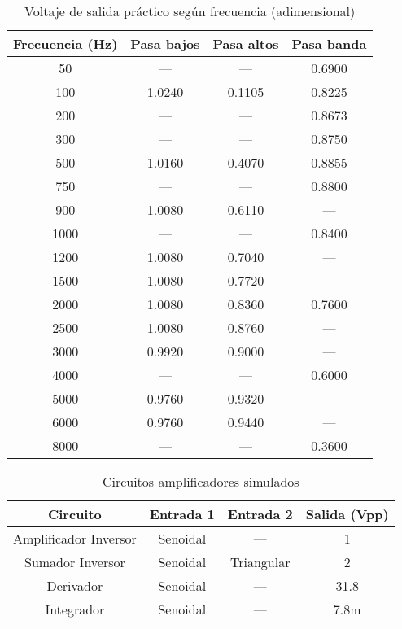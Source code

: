 \begin{table}[H]
  \centering
  \caption{Voltaje de salida práctico según frecuencia (adimensional)}\label{tab:filtros_practicos}
  \begin{tabular}{cccc}
    \toprule
    \textbf{Frecuencia (Hz)} & \textbf{Pasa bajos} & \textbf{Pasa altos} & \textbf{Pasa banda} \\
    \midrule
    50    & ---    & ---    & 0.6900 \\
    100   & 1.0240 & 0.1105 & 0.8225 \\
    200   & ---    & ---    & 0.8673 \\
    300   & ---    & ---    & 0.8750 \\
    500   & 1.0160 & 0.4070 & 0.8855 \\
    750   & ---    & ---    & 0.8800 \\
    900   & 1.0080 & 0.6110 & ---     \\
    1000  & ---    & ---    & 0.8400 \\
    1200  & 1.0080 & 0.7040 & ---     \\
    1500  & 1.0080 & 0.7720 & ---     \\
    2000  & 1.0080 & 0.8360 & 0.7600 \\
    2500  & 1.0080 & 0.8760 & ---     \\
    3000  & 0.9920 & 0.9000 & ---     \\
    4000  & ---    & ---    & 0.6000 \\
    5000  & 0.9760 & 0.9320 & ---     \\
    6000  & 0.9760 & 0.9440 & ---     \\
    8000  & ---    & ---    & 0.3600 \\
    \bottomrule
  \end{tabular}
\end{table}

\begin{table}[H]
  \centering
  \caption{Circuitos amplificadores simulados}\label{tab:amplificadores_simulacion}
  \begin{tabular}{cccc}
    \toprule
    \textbf{Circuito} & \textbf{Entrada 1} & \textbf{Entrada 2} & \textbf{Salida (Vpp)} \\
    \midrule
    Amplificador Inversor  & Senoidal & ---         & 1    \\
    Sumador Inversor       & Senoidal & Triangular & 2    \\
    Derivador              & Senoidal & ---         & 31.8 \\
    Integrador             & Senoidal & ---         & 7.8m \\
    \bottomrule
  \end{tabular}
\end{table}


